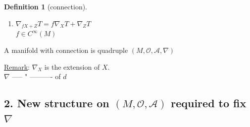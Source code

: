 \documentclass[10pt]{amsart}
\newtheorem{definition}{Definition}
\begin{document}
\begin{multicols*}{2}
\begin{definition}[connection]
\begin{enumerate}
"Leibnitz" rule.
			\item[(iv)] $\nabla_{fX+Z} T = f\nabla_X T + \nabla_Z T$ \\
	$ f\in C^{\infty}(M)$
\end{enumerate}
\end{definition} 


	
	A manifold with connection is quadruple $(M, \mathcal{O}, \mathcal{A}, \nabla)$ 

\underline{Remark}: $\nabla_X$ is the extension of $X$. \\
\phantom{Remark: } $\nabla $ ----- " ---------- of $d$
	
	
	
	
		
		
		
			
			
%			
	
	\subsection*{2. New structure on $(M,\mathcal{O},\mathcal{A})$ required to fix $\nabla$}


\end{multicols*}
\end{document}
